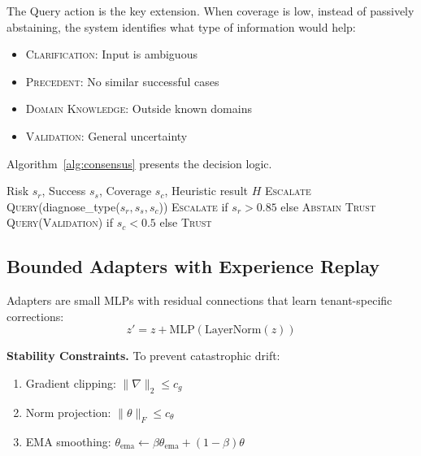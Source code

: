 \documentclass[twoside,11pt]{article}
\begin{document}
The Query action is the key extension. When coverage is low, instead of passively abstaining, the system identifies what type of information would help:
\begin{itemize}
    \item \textsc{Clarification}: Input is ambiguous
    \item \textsc{Precedent}: No similar successful cases
    \item \textsc{Domain Knowledge}: Outside known domains
    \item \textsc{Validation}: General uncertainty
\end{itemize}

Algorithm~\ref{alg:consensus} presents the decision logic.

\begin{algorithm}[t]
\caption{Consensus Engine Decision}
\label{alg:consensus}
\begin{algorithmic}[1]
\Require Risk $s_r$, Success $s_s$, Coverage $s_c$, Heuristic result $H$
    \State \Return \textsc{Escalate}
\EndIf
{}
    \State \Return \textsc{Query}(diagnose\_type($s_r, s_s, s_c$))
\EndIf
{}
    \State \Return \textsc{Escalate} if $s_r > 0.85$ else \textsc{Abstain}
\EndIf
{}
    \State \Return \textsc{Trust}
\EndIf
\State \Return \textsc{Query}(\textsc{Validation}) if $s_c < 0.5$ else \textsc{Trust}
\end{algorithmic}
\end{algorithm}

\subsection{Bounded Adapters with Experience Replay}
\label{sec:adapters}

Adapters are small MLPs with residual connections that learn tenant-specific corrections:
\begin{equation}
    z' = z + \text{MLP}(\text{LayerNorm}(z))
\end{equation}

\textbf{Stability Constraints.} To prevent catastrophic drift:
\begin{enumerate}
    \item Gradient clipping: $\|\nabla\|_2 \leq c_g$
    \item Norm projection: $\|\theta\|_F \leq c_\theta$
    \item EMA smoothing: $\theta_{\text{ema}} \leftarrow \beta \theta_{\text{ema}} + (1-\beta)\theta$
\end{enumerate}
\end{document}
